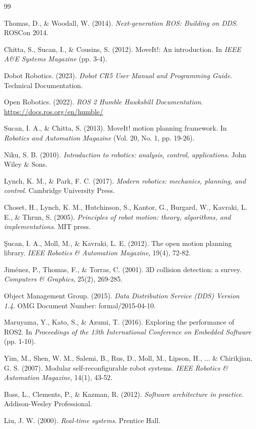 \documentclass[12pt,a4paper,twoside,openright]{book}
\begin{document}
\begin{thebibliography}{99}

Thomas, D., \& Woodall, W. (2014). \textit{Next-generation ROS: Building on DDS}. ROSCon 2014.

Chitta, S., Sucan, I., \& Cousins, S. (2012). MoveIt!: An introduction. In \textit{IEEE A\&E Systems Magazine} (pp. 3-4).

Dobot Robotics. (2023). \textit{Dobot CR5 User Manual and Programming Guide}. Technical Documentation.

Open Robotics. (2022). \textit{ROS 2 Humble Hawksbill Documentation}. \url{https://docs.ros.org/en/humble/}

Sucan, I. A., \& Chitta, S. (2013). MoveIt! motion planning framework. In \textit{Robotics and Automation Magazine} (Vol. 20, No. 1, pp. 19-26).

Niku, S. B. (2010). \textit{Introduction to robotics: analysis, control, applications}. John Wiley \& Sons.

Lynch, K. M., \& Park, F. C. (2017). \textit{Modern robotics: mechanics, planning, and control}. Cambridge University Press.

Choset, H., Lynch, K. M., Hutchinson, S., Kantor, G., Burgard, W., Kavraki, L. E., \& Thrun, S. (2005). \textit{Principles of robot motion: theory, algorithms, and implementations}. MIT press.

Şucan, I. A., Moll, M., \& Kavraki, L. E. (2012). The open motion planning library. \textit{IEEE Robotics \& Automation Magazine}, 19(4), 72-82.

Jiménez, P., Thomas, F., \& Torras, C. (2001). 3D collision detection: a survey. \textit{Computers \& Graphics}, 25(2), 269-285.

Object Management Group. (2015). \textit{Data Distribution Service (DDS) Version 1.4}. OMG Document Number: formal/2015-04-10.

Maruyama, Y., Kato, S., \& Azumi, T. (2016). Exploring the performance of ROS2. In \textit{Proceedings of the 13th International Conference on Embedded Software} (pp. 1-10).

Yim, M., Shen, W. M., Salemi, B., Rus, D., Moll, M., Lipson, H., ... \& Chirikjian, G. S. (2007). Modular self-reconfigurable robot systems. \textit{IEEE Robotics \& Automation Magazine}, 14(1), 43-52.

Bass, L., Clements, P., \& Kazman, R. (2012). \textit{Software architecture in practice}. Addison-Wesley Professional.

Liu, J. W. (2000). \textit{Real-time systems}. Prentice Hall.

\end{thebibliography}
\end{document}
